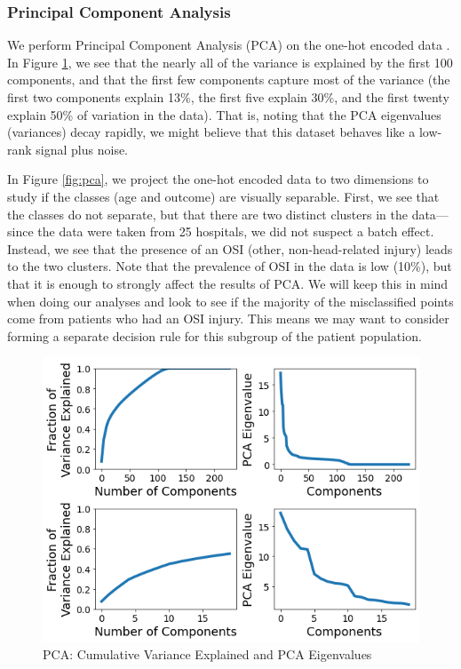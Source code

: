 \documentclass[11pt, letterpaper]{amsart}
\let\Oldsubsubsection\subsubsection
\renewcommand{\subsubsection}{\FloatBarrier\Oldsubsubsection}
\begin{document}
\subsubsection{Principal Component Analysis}

We perform Principal Component Analysis (PCA) on the one-hot encoded data \cite{pearson1901liii}. In Figure \ref{fig:pca_cum_var}, we see that the nearly all of the variance is explained by the first 100 components, and that the first few components capture most of the variance (the first two components explain 13\%, the first five explain 30\%, and the first twenty explain 50\% of variation in the data). That is, noting that the PCA eigenvalues (variances) decay rapidly, we might believe that this dataset behaves like a low-rank signal plus noise. 

In Figure \ref{fig:pca}, we project the one-hot encoded data to two dimensions to study if the classes (age and outcome) are visually separable. First, we see that the classes do not separate, but that there are two distinct clusters in the data---since the data were taken from 25 hospitals, we did not suspect a batch effect. Instead, we see that the presence of an OSI (other, non-head-related injury) leads to the two clusters. Note that the prevalence of OSI in the data is low (10\%), but that it is enough to strongly affect the results of PCA. We will keep this in mind when doing our analyses and look to see if the majority of the misclassified points come from patients who had an OSI injury. This means we may want to consider forming a separate decision rule for this subgroup of the patient population.
\begin{figure}
	\centering
	\includegraphics[width=\textwidth]{pca_cum_var.png}
	\caption{PCA: Cumulative Variance Explained and PCA Eigenvalues}\label{fig:pca_cum_var}
\end{figure}
\end{document}
